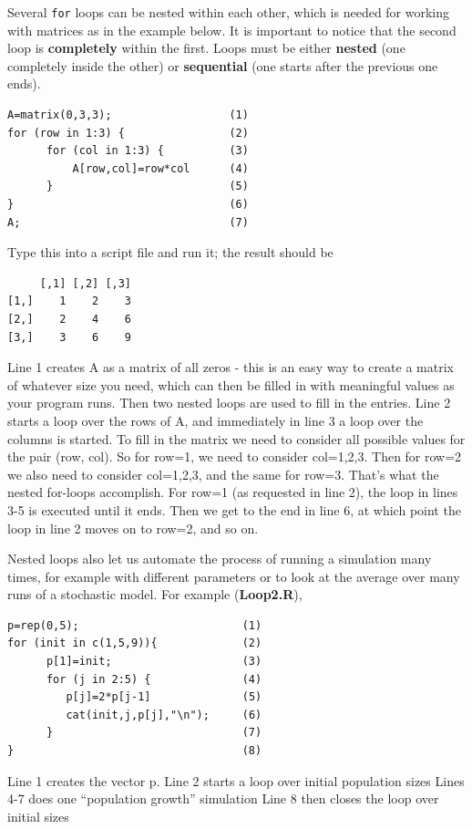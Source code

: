 \documentclass [11pt]{article}
\def\n{\mathbf{n}}
\newcommand{\blst}{\vspace{-0.035in} \begin{lstlisting}}
\numberwithin{exercise}{section}
\begin{document}
Several \texttt{for} loops can be nested within each other, which is needed 
for working with matrices as in the example below. It is important to notice 
that the second loop is \textbf{completely }within the first. Loops must be 
either \textbf{nested} (one completely inside the other) or 
\textbf{sequential} (one starts after the previous one ends). 
\blst
A=matrix(0,3,3);                  (1)
for (row in 1:3) {                (2) 
      for (col in 1:3) {          (3) 
          A[row,col]=row*col      (4)
      }                           (5)
}                                 (6)
A;                                (7) 
\end{lstlisting} 

Type this into a script file and run it; the result should be
\blst
     [,1] [,2] [,3]
[1,]    1    2    3
[2,]    2    4    6
[3,]    3    6    9
\end{lstlisting}

Line 1 creates A as a matrix of all zeros - this is an easy way to create a 
matrix of whatever size you need, which can then be filled in with 
meaningful values as your program runs. Then two nested loops are 
used to fill in the entries. Line 2 starts a loop over the rows of A, and 
immediately in line 3 a loop over the columns is started. To 
fill in the matrix we need to consider all possible values for the pair 
(row, col). So for row=1, we need to consider col=1,2,3. Then for 
row=2 we also need to consider col=1,2,3, and the same for row=3. That's 
what the nested for-loops accomplish. For row=1 (as requested in line 2), 
the loop in lines 3-5 is executed until it ends. Then we get to the end in 
line 6, at which point the loop in line 2 moves on to row=2, and so on.

Nested loops also let us automate the process of running a simulation many
times, for example with different parameters or to look at the average over
many runs of a stochastic model. For example (\textbf{Loop2.R}), 
\blst
p=rep(0,5);                         (1) 
for (init in c(1,5,9)){             (2) 
      p[1]=init;                    (3) 
      for (j in 2:5) {              (4) 	
         p[j]=2*p[j-1]              (5) 
         cat(init,j,p[j],"\n");     (6) 	  
      }                             (7) 
}                                   (8) 
\end{lstlisting}

Line 1 creates the vector p.
Line 2 starts a loop over initial population sizes
Lines 4-7 does one ``population growth'' simulation
Line 8 then closes the loop over initial sizes
\end{document}

